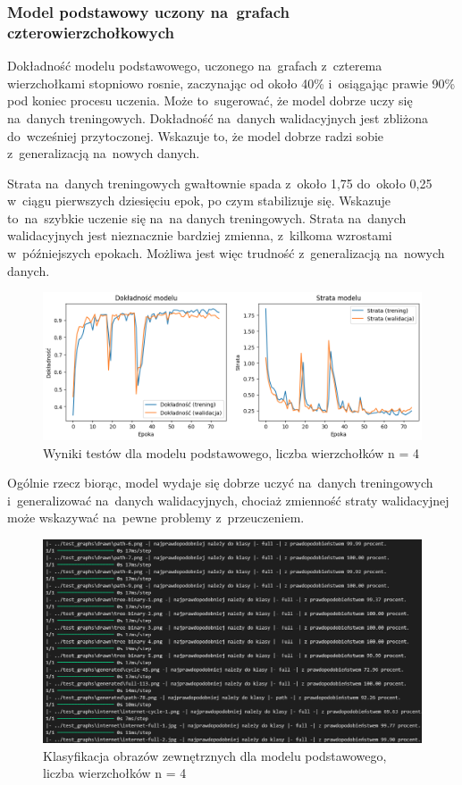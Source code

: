 \subsubsection{Model podstawowy uczony na~grafach czterowierzchołkowych}

Dokładność modelu podstawowego, uczonego na~grafach z~czterema wierzchołkami stopniowo rosnie,
zaczynając od około 40\% i~osiągając prawie 90\% pod koniec procesu uczenia.
Może to~sugerować, że model dobrze uczy się na~danych treningowych.
Dokładność na~danych walidacyjnych jest zbliżona do~wcześniej przytoczonej.
Wskazuje to, że model dobrze radzi sobie z~generalizacją na~nowych danych.

Strata na~danych treningowych gwałtownie spada z~około 1,75 do~około 0,25 w~ciągu pierwszych dziesięciu epok,
po czym stabilizuje się.
Wskazuje to~na~szybkie uczenie się na~na danych treningowych.
Strata na~danych walidacyjnych jest nieznacznie bardziej zmienna,
z~kilkoma wzrostami w~późniejszych epokach.
Możliwa jest więc trudność z~generalizacją na~nowych danych.

\begin{figure}[ht]
	\centering
	\includegraphics[width=15.5cm]{resources/tests/images/v3/base4_img.png}
	\caption{Wyniki testów dla modelu podstawowego, liczba wierzchołków n = 4}
	\label{Fig:tests-base-1a}
\end{figure}
\FloatBarrier

Ogólnie rzecz biorąc, model wydaje się dobrze uczyć na~danych treningowych i~generalizować na~danych walidacyjnych,
chociaż zmienność straty walidacyjnej może wskazywać na~pewne problemy z~przeuczeniem.

\begin{figure}[ht]
	\centering
	\includegraphics[width=15.5cm]{resources/tests/images/v3/base4_txt.png}
	\caption{Klasyfikacja obrazów zewnętrznych dla modelu podstawowego, liczba wierzchołków n = 4}
	\label{Fig:tests-base-1b}
\end{figure}
\FloatBarrier

